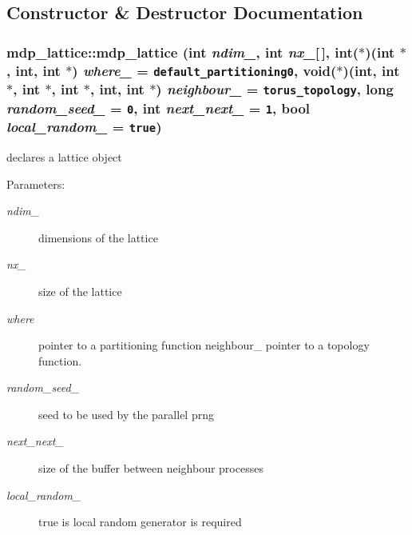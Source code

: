 \subsection{Constructor \& Destructor Documentation}
\hypertarget{classmdp__lattice_2a5e64934c300b14f60a05ddf4f0c73d}{
\subsubsection[{mdp\_\-lattice}]{\setlength{\rightskip}{0pt plus 5cm}mdp\_\-lattice::mdp\_\-lattice (int {\em ndim\_\-}, \/  int {\em nx\_\-}\mbox{[}$\,$\mbox{]}, \/  int($\ast$)(int $\ast$, int, int $\ast$) {\em where\_\-} = {\tt default\_\-partitioning0}, \/  void($\ast$)(int, int $\ast$, int $\ast$, int $\ast$, int, int $\ast$) {\em neighbour\_\-} = {\tt torus\_\-topology}, \/  long {\em random\_\-seed\_\-} = {\tt 0}, \/  int {\em next\_\-next\_\-} = {\tt 1}, \/  bool {\em local\_\-random\_\-} = {\tt true})}}
\label{classmdp__lattice_2a5e64934c300b14f60a05ddf4f0c73d}


declares a lattice object \begin{Desc}
\item[Parameters:]
\begin{description}
\item[{\em ndim\_\-}]dimensions of the lattice \item[{\em nx\_\-}]size of the lattice \item[{\em where}]pointer to a partitioning function  neighbour\_\- pointer to a topology function. \item[{\em random\_\-seed\_\-}]seed to be used by the parallel prng \item[{\em next\_\-next\_\-}]size of the buffer between neighbour processes \item[{\em local\_\-random\_\-}]true is local random generator is required \end{description}
\end{Desc}


